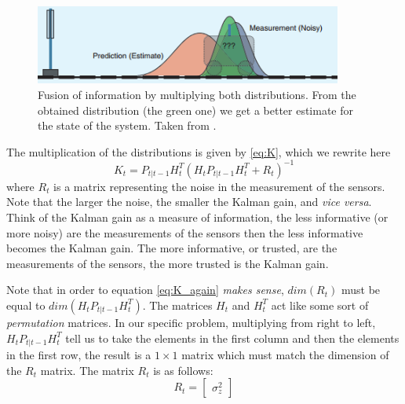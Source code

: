 \documentclass[12pt,a4paper,final]{article} %
\begin{document}
\begin{figure}
  \centering
  \includegraphics[width=0.90\textwidth]{object_1D_04}
  \caption{Fusion of information by multiplying both
    distributions. From the obtained distribution (the green one) we
    get a better estimate for the state of the system. Taken from
    \cite{Faragher:2012:ARTICLE}.}
  \label{fig:object_1D_04}
\end{figure}

The multiplication of the distributions is given by \eqref{eq:K},
which we rewrite here
\begin{equation}
  \label{eq:K_again}
  K_t= P_{t|t-1} H_t^T (H_t P_{t|t-1} H_t^T+R_t)^{-1}
\end{equation}
where $R_t$ is a matrix representing the noise in the measurement of
the sensors. Note that the larger the noise, the smaller the Kalman
gain, and \textit{vice versa}. Think of the Kalman gain as a measure
of information, the less informative (or more noisy) are the
measurements of the sensors then the less informative becomes the
Kalman gain. The more informative, or trusted, are the measurements of
the sensors, the more trusted is the Kalman gain.

Note that in order to equation \eqref{eq:K_again} \textit{makes
  sense}, $dim(R_t)$ must be equal to $dim(H_t P_{t|t-1} H_t^T)$. The
matrices $H_t$ and $H_t^T$ act like some sort of \textit{permutation}
matrices. In our specific problem, multiplying from right to left,
$H_t P_{t|t-1} H_t^T$ tell us to take the elements in the first column
and then the elements in the first row, the result is a $1 \times 1$
matrix which must match the dimension of the $R_t$ matrix. The matrix
$R_t$ is as follows:
\begin{equation}
  \label{eq:noise_measurements}
  R_t = 
  \begin{bmatrix}
    \sigma_z^2
  \end{bmatrix}
\end{equation}
\end{document}
